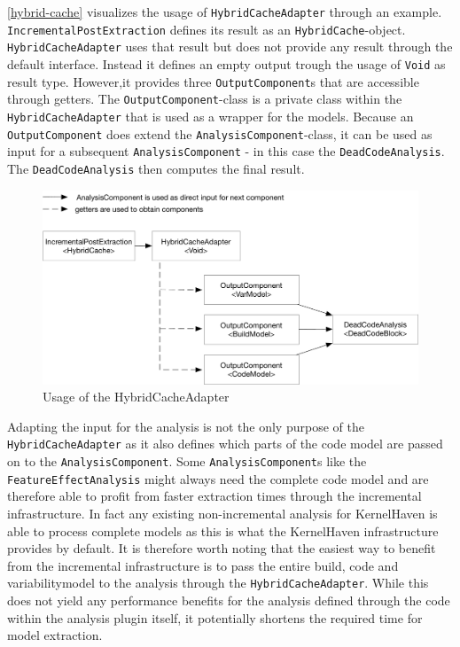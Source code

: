 \documentclass[a4paper]{article}
\begin{document}
\autoref{hybrid-cache} visualizes the usage of \texttt{Hybrid\-Cache\-Adapter} through an example. \texttt{Incremental\-Post\-Extraction} defines its result as an \texttt{Hybrid\-Cache}-object. \texttt{Hybrid\-Cache\-Adapter} uses that result but does not provide any result through the default interface. Instead it defines an empty output trough the usage of \texttt{Void} as result type. However,it provides three \texttt{Output\-Component}s that are accessible through getters. The \texttt{Output\-Component}-class is a private class within the \texttt{Hybrid\-Cache\-Adapter} that is used as a wrapper for the models. Because an \texttt{Output\-Component} does extend the \texttt{Analysis\-Component}-class, it can be used as input for a subsequent \texttt{Analysis\-Component} - in this case the \texttt{Dead\-Code\-Analysis}. The \texttt{Dead\-Code\-Analysis} then computes the final result.

\begin{figure}[h] 
  \centering
  \begin{minipage}[b]{1\textwidth} 
    \caption[Usage of the HybridCacheAdapter]{Usage of the HybridCacheAdapter}\label{hybrid-cache}
    \includegraphics[width=1\textwidth]{img/HybridCacheAdapter.pdf}
  \end{minipage}
\end{figure}

Adapting the input for the analysis is not the only purpose of the \texttt{Hybrid\-Cache\-Adapter} as it also defines which parts of the code model are passed on to the \texttt{Analysis\-Component}. Some  \texttt{Analysis\-Component}s like the \texttt{FeatureEffectAnalysis} \cite{feature-effect-analysis}\cite{Nadi15wheredo} might always need the complete code model and are therefore able to profit from faster extraction times through the incremental infrastructure. In fact any existing non-incremental analysis for KernelHaven is able to process complete models as this is what the KernelHaven infrastructure provides by default. It is therefore worth noting that the easiest way to benefit from the incremental infrastructure is to pass the entire build, code and variabilitymodel to the analysis through the \texttt{Hybrid\-Cache\-Adapter}. While this does not yield any performance benefits for the analysis defined through the code within the analysis plugin itself, it potentially shortens the required time for model extraction.
\end{document}

